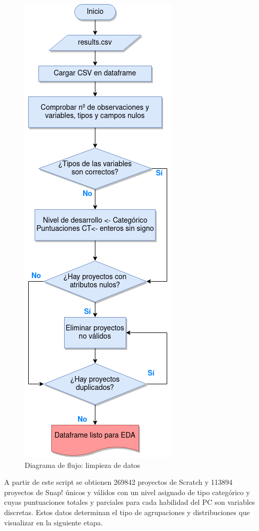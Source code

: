 \documentclass[a4paper, 12pt]{book}
\begin{document}
\begin{figure}[ht]
    \centering
    \includegraphics[height=.6\textheight]{img/script_clean2.png}
    \caption{Diagrama de flujo: limpieza de datos}\label{fig:script_clean}
\end{figure}

A partir de este script se obtienen 269842 proyectos de Scratch y 113894 proyectos de Snap! únicos y válidos con un nivel asignado de tipo categórico y cuyas puntuaciones totales y parciales para cada habilidad del PC son variables discretas. Estos datos determinan el tipo de agrupaciones y distribuciones que visualizar en la siguiente etapa.
\end{document}
